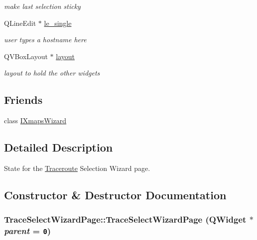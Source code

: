 \begin{CompactItemize}
\begin{CompactList}\small\item\em make last selection sticky \item\end{CompactList}\item 
\hypertarget{classTraceSelectWizardPage_d9b6cc99cdf592981f43d2bb6c78bbee}{
QLineEdit $\ast$ \hyperlink{classTraceSelectWizardPage_d9b6cc99cdf592981f43d2bb6c78bbee}{le\_\-single}}
\label{classTraceSelectWizardPage_d9b6cc99cdf592981f43d2bb6c78bbee}

\begin{CompactList}\small\item\em user types a hostname here \item\end{CompactList}\item 
\hypertarget{classTraceSelectWizardPage_61b468a750afce70fe4cb888eeb2f12a}{
QVBoxLayout $\ast$ \hyperlink{classTraceSelectWizardPage_61b468a750afce70fe4cb888eeb2f12a}{layout}}
\label{classTraceSelectWizardPage_61b468a750afce70fe4cb888eeb2f12a}

\begin{CompactList}\small\item\em layout to hold the other widgets \item\end{CompactList}\end{CompactItemize}
\subsection*{Friends}
\begin{CompactItemize}
\item 
\hypertarget{classTraceSelectWizardPage_d62a26a0af746c34a19cd066f6dabd22}{
class \hyperlink{classTraceSelectWizardPage_d62a26a0af746c34a19cd066f6dabd22}{IXmapsWizard}}
\label{classTraceSelectWizardPage_d62a26a0af746c34a19cd066f6dabd22}

\end{CompactItemize}


\subsection{Detailed Description}
State for the \hyperlink{classTraceroute}{Traceroute} Selection Wizard page. 

\subsection{Constructor \& Destructor Documentation}
\hypertarget{classTraceSelectWizardPage_52bc076b279131bd43e9e80dc94eaf41}{
\subsubsection[TraceSelectWizardPage]{\setlength{\rightskip}{0pt plus 5cm}TraceSelectWizardPage::TraceSelectWizardPage (QWidget $\ast$ {\em parent} = {\tt 0})}}
\label{classTraceSelectWizardPage_52bc076b279131bd43e9e80dc94eaf41}


